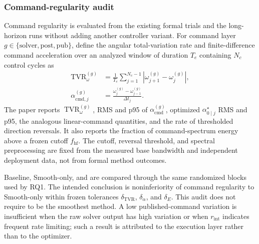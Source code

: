 \subsubsection{Command-regularity audit}

Command regularity is evaluated from the existing formal trials and the
long-horizon runs without adding another controller variant. For command layer
$g\in\{\mathrm{solver},\mathrm{post},\mathrm{pub}\}$, define the angular
total-variation rate and finite-difference command acceleration over an
analyzed window of duration $T_e$ containing $N_c$ control cycles as
\begin{equation}
\begin{aligned}
  \operatorname{TVR}_{\omega}^{(g)}
  &=\frac{1}{T_e}
  \sum_{j=1}^{N_c-1}
  |\omega_{j+1}^{(g)}-\omega_j^{(g)}|,\\
  \alpha_{\mathrm{cmd},j}^{(g)}
  &=\frac{\omega_j^{(g)}-\omega_{j-1}^{(g)}}{\Delta t_j}.
\end{aligned}
  \label{eq:command_regularity_metrics}
\end{equation}
The paper reports $\operatorname{TVR}_{\omega}^{(g)}$, RMS and p95 of
$\alpha_{\mathrm{cmd}}^{(g)}$, optimized $\alpha_{0\mid j}^{\star}$ RMS and
p95, the analogous linear-command quantities, and the rate of thresholded
direction reversals. It also reports the fraction of command-spectrum energy
above a frozen cutoff $f_{\mathrm{hf}}$. The cutoff, reversal threshold, and
spectral preprocessing are fixed from the measured base bandwidth and
independent deployment data, not from formal method outcomes.

Baseline, Smooth-only, and \SMPCC{} are compared through the same randomized
blocks used by RQ1. The intended conclusion is noninferiority of \SMPCC{}
command regularity to Smooth-only within frozen tolerances
$\delta_{\mathrm{TVR}}$, $\delta_{\alpha}$, and $\delta_{E}$. This audit does
not require \SMPCC{} to be the smoothest method. A low published-command
variation is insufficient when the raw solver output has high variation or
when $r_{\mathrm{int}}$ indicates frequent rate limiting; such a result is
attributed to the execution layer rather than to the optimizer.


